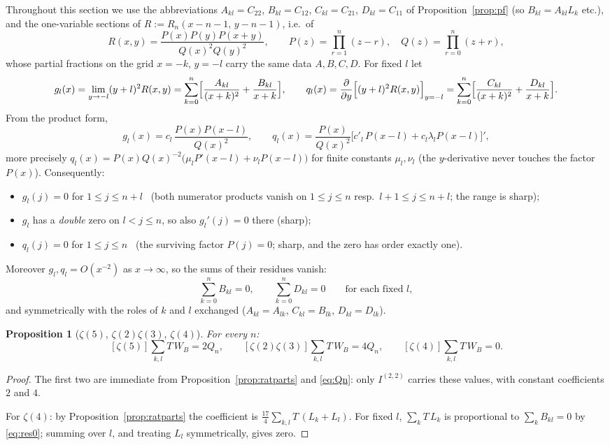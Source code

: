 \documentclass[11pt]{article}
\newtheorem{proposition}{Proposition}
\theoremstyle{remark}
\begin{document}
Throughout this section we use the abbreviations
$A_{kl}=C_{22}$, $B_{kl}=C_{12}$, $C_{kl}=C_{21}$, $D_{kl}=C_{11}$ of
Proposition~\ref{prop:pf} (so $B_{kl}=A_{kl}L_k$ etc.), and the one-variable
sections of $R:=R_n(x-n-1,\,y-n-1)$, i.e.\ of
\[
 R(x,y)=\frac{P(x)P(y)P(x+y)}{Q(x)^2Q(y)^2},\qquad
 P(z)=\prod_{r=1}^n(z-r),\quad Q(z)=\prod_{r=0}^n(z+r),
\]
whose partial fractions on the grid $x=-k$, $y=-l$ carry the same data
$A,B,C,D$.  For fixed $l$ let
\[
 g_l(x)=\lim_{y\to-l}(y+l)^2R(x,y)
 =\sum_{k=0}^n\Bigl[\frac{A_{kl}}{(x+k)^2}+\frac{B_{kl}}{x+k}\Bigr],
\qquad
 q_l(x)=\frac{\partial}{\partial y}\Bigl[(y+l)^2R(x,y)\Bigr]_{y=-l}
 =\sum_{k=0}^n\Bigl[\frac{C_{kl}}{(x+k)^2}+\frac{D_{kl}}{x+k}\Bigr].
\]
From the product form,
\begin{equation}\label{eq:gq}
 g_l(x)=c_l\,\frac{P(x)P(x-l)}{Q(x)^2},
 \qquad
 q_l(x)=\frac{P(x)}{Q(x)^2}\bigl[c'_l\,P(x-l)+c_l\lambda_l P(x-l)\bigr]',
\end{equation}
more precisely $q_l(x)=P(x)Q(x)^{-2}\bigl(\mu_l P'(x-l)+\nu_l P(x-l)\bigr)$
for finite constants $\mu_l,\nu_l$ (the $y$-derivative never touches the
factor $P(x)$).  Consequently:
\begin{itemize}
\item[(Z1)] $g_l(j)=0$ for $1\le j\le n+l$ \ (both numerator products
vanish on $1\le j\le n$ resp.\ $l+1\le j\le n+l$; the range is sharp);
\item[(Z2)] $g_l$ has a \emph{double} zero on $l<j\le n$, so also
$g_l'(j)=0$ there (sharp);
\item[(Z3)] $q_l(j)=0$ for $1\le j\le n$ \ (the surviving factor $P(j)=0$;
sharp, and the zero has order exactly one).
\end{itemize}
Moreover $g_l,q_l=O(x^{-2})$ as $x\to\infty$, so the sums of their residues
vanish:
\begin{equation}\label{eq:res0}
 \sum_{k=0}^nB_{kl}=0,
 \qquad
 \sum_{k=0}^nD_{kl}=0
 \qquad\text{for each fixed } l,
\end{equation}
and symmetrically with the roles of $k$ and $l$ exchanged
($A_{kl}=A_{lk}$, $C_{kl}=B_{lk}$, $D_{kl}=D_{lk}$).

\begin{proposition}[$\zeta(5)$, $\zeta(2)\zeta(3)$, $\zeta(4)$]
\label{prop:z5z4}
For every $n$:
\[
 [\zeta(5)]\sum_{k,l}T\,W_B=2Q_n,\qquad
 [\zeta(2)\zeta(3)]\sum_{k,l}T\,W_B=4Q_n,\qquad
 [\zeta(4)]\sum_{k,l}T\,W_B=0 .
\]
\end{proposition}

\begin{proof}
The first two are immediate from Proposition~\ref{prop:ratparts} and
\eqref{eq:Qn}: only $I^{(2,2)}$ carries these values, with constant
coefficients $2$ and $4$.

For $\zeta(4)$: by Proposition~\ref{prop:ratparts} the coefficient is
$\frac{17}4\sum_{k,l}T\,(L_k+L_l)$.  For fixed $l$,
$\sum_kT\,L_k$ is proportional to $\sum_kB_{kl}=0$ by \eqref{eq:res0};
summing over $l$, and treating $L_l$ symmetrically, gives zero.
\end{proof}
\end{document}
